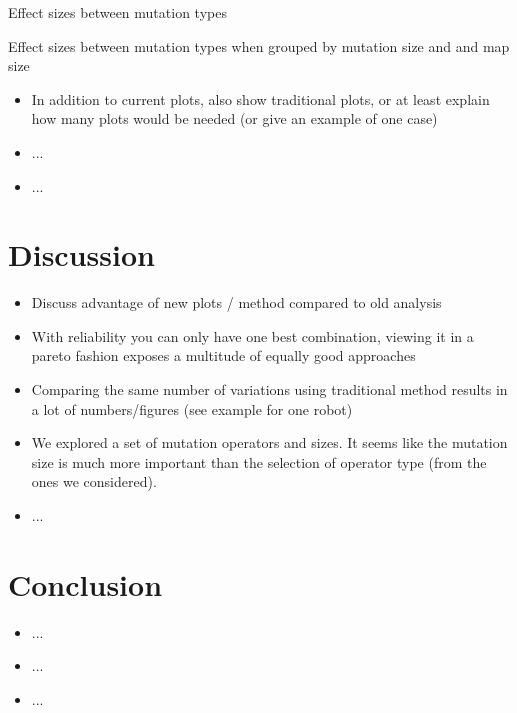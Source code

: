 \documentclass[sigconf, anonymous=false]{acmart}
\begin{document}
\begin{table}
\caption{Effect sizes between mutation types}

\end{table}

\begin{table}
\caption{Effect sizes between mutation types when grouped by mutation size and and map size}

\end{table}

\begin{itemize}
\item In addition to current plots, also show traditional plots, or at least explain how many plots would be needed (or give an example of one case)
\item ...
\item ...
\end{itemize}


\section{Discussion}
\begin{itemize}
\item Discuss advantage of new plots / method compared to old analysis
\item With reliability you can only have one best combination, viewing it in a pareto fashion exposes a multitude of equally good approaches
\item Comparing the same number of variations using traditional method results in a lot of numbers/figures (see example for one robot)
\item We explored a set of mutation operators and sizes. It seems like the mutation size is much more important than the selection of operator type (from the ones we considered).
\item ...
\end{itemize}


\section{Conclusion}
\begin{itemize}
\item ...
\item ...
\item ...
\end{itemize}



\end{document}
